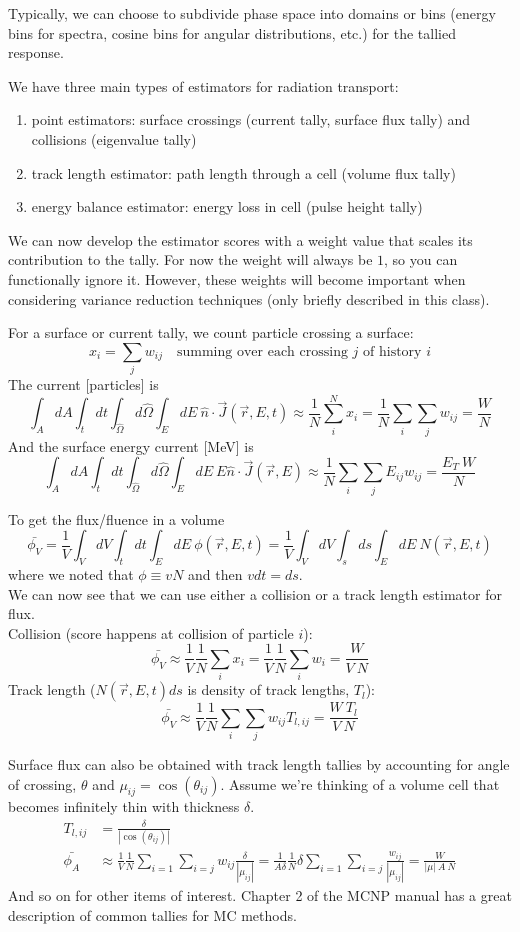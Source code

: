 \documentclass[12pt]{article}
\newcommand{\rvec}{\ensuremath{\vec{r}}}
\newcommand{\vOmega}{\ensuremath{\hat{\Omega}}}
\begin{document}
Typically, we can choose to subdivide phase space into domains or bins (energy bins for spectra, cosine bins for angular distributions, etc.) for the tallied response.

We have three main types of estimators for radiation transport:
\begin{enumerate}
\item point estimators: surface crossings (current tally, surface flux tally) and collisions (eigenvalue tally)
\item track length estimator: path length through a cell (volume flux tally)
\item energy balance estimator: energy loss in cell (pulse height tally)
\end{enumerate}
%
We can now develop the estimator scores with a weight value that scales its contribution to the tally.
For now the weight will always be $1$, so you can functionally ignore it. 
However, these weights will become important when considering variance reduction techniques (only briefly described in this class).

For a surface or current tally, we count particle crossing a surface:
\[
x_i = \sum_j w_{ij} \quad \text{summing over each crossing }j\text{ of history }i
\]
The current [particles] is
\[
\int_A dA \int_t dt \int_{\vOmega} d\vOmega \int_E dE\: \hat{n} \cdot \vec{J}(\rvec, E, t) \approx \frac{1}{N} \sum_{i}^N x_i = \frac{1}{N} \sum_{i}\sum_{j} w_{ij}=\frac{W}{N}
\]
And the surface energy current [MeV] is
\[
\int_A dA \int_t dt  \int_{\vOmega} d\vOmega \int_E dE\: E\hat{n} \cdot \vec{J}(\rvec, E) \approx \frac{1}{N} \sum_{i}\sum_{j} E_{ij}w_{ij} = \frac{E_T\:W}{N}
\]

To get the flux/fluence in a volume
\[
\bar{\phi_V} = \frac{1}{V}\int_V dV \int_t dt \int_E dE\: \phi(\rvec, E,t) =  \frac{1}{V}\int_V dV \int_s ds \int_E dE\: N(\rvec, E,t)
\]
where we noted that $\phi \equiv vN$ and then $vdt = ds$.\\
We can now see that we can use either a collision or a track length estimator for flux.\\
Collision (score happens at collision of particle $i$):
\[
\bar{\phi_V} \approx \frac{1}{V}\frac{1}{N} \sum_{i} x_i = \frac{1}{V}\frac{1}{N} \sum_{i} w_i = \frac{W}{V \: N}
\]
Track length ($N(\rvec, E,t)ds$ is density of track lengths, $T_l$):
\[
\bar{\phi_V} \approx \frac{1}{V}\frac{1}{N} \sum_{i}\sum_{j} w_{ij}T_{l,ij} = \frac{W \: T_l}{V \: N}
\]

Surface flux can also be obtained with track length tallies by accounting for angle of crossing, $\theta$ and $\mu_{ij} = \cos(\theta_{ij})$. Assume we're thinking of a volume cell that becomes infinitely thin with thickness $\delta$. 
\begin{align*}
T_{l,ij} &= \frac{\delta}{|\cos(\theta_{ij})|}\\
\bar{\phi_A} &\approx \frac{1}{V}\frac{1}{N} \sum_{i=1}\sum_{i=j} w_{ij}\frac{\delta}{|\mu_{ij}|} = \frac{1}{A \delta}\frac{1}{N} \delta \sum_{i=1}\sum_{i=j} \frac{w_{ij}}{|\mu_{ij}|} = \frac{W}{|\mu | \: A \: N}
\end{align*}
%
And so on for other items of interest.  
Chapter 2 of the MCNP manual has a great description of common tallies for MC methods.
\end{document}
